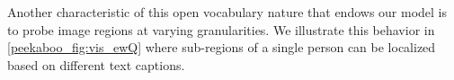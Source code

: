 
Another characteristic of this open vocabulary nature that endows our model is to probe image regions at varying granularities. We illustrate this behavior in \cref{peekaboo_fig:vis_ewQ} where sub-regions of a single person can be localized based on different text captions. 



%


